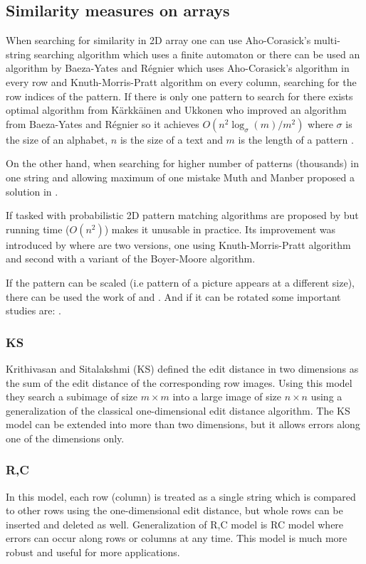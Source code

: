 \subsection{Similarity measures on arrays}
When searching for similarity in 2D array one can use Aho-Corasick's multi-string searching algorithm \cite{ahocor} which uses a finite automaton or there can be used an algorithm by Baeza-Yates and R{\' e}gnier \cite{baeza1993fast} which uses Aho-Corasick's algorithm in every row and Knuth-Morris-Pratt algorithm on every column, searching for the row indices of the pattern. If there is only one pattern to search for there exists optimal algorithm from K{\"a}rkk{\"a}inen and Ukkonen who improved an algorithm from Baeza-Yates and R{\' e}gnier so it achieves $O(n^2 \log_\sigma (m) / m^2)$ where $\sigma$ is the size of an alphabet, $n$ is the size of a text and $m$ is the length of a pattern \cite{karkoptimal}. 

On the other hand, when searching for higher number of patterns (thousands) in one string and allowing maximum of one mistake Muth and Manber proposed a solution in \cite{1erroronly}.

If tasked with probabilistic 2D pattern matching algorithms are proposed by \cite{kr87} but running time ($O(n^2)$) makes it unusable in practice. Its improvement was introduced by \cite{zt89} where are two versions, one using Knuth-Morris-Pratt algorithm and second with a variant of the Boyer-Moore algorithm.

If the pattern can be scaled (i.e pattern of a picture appears at a different size), there can be used the work of \cite{realscaledmatch} and \cite{alphscalematch}. And if it can be rotated some important studies are: \cite{patternrotation1,patternrotation2,patternrotation3}.

\subsubsection{KS}
Krithivasan and Sitalakshmi (KS) defined the edit distance in two dimensions as the sum of the edit distance of the corresponding row images. Using this model they search a subimage of size $m \times m$ into a large image of size $n \times n$ using a generalization of the classical one-dimensional edit distance algorithm.
The KS model can be extended into more than two dimensions, but it allows errors along one of the dimensions only.
\subsubsection{R,C}
In this model, each row (column) is treated as a single string which is compared to other rows using the one-dimensional edit distance, but 
whole rows can be inserted and deleted as well.
Generalization of R,C model is RC model where errors can occur along rows or columns at any time. This model is much more robust and useful for more applications.
